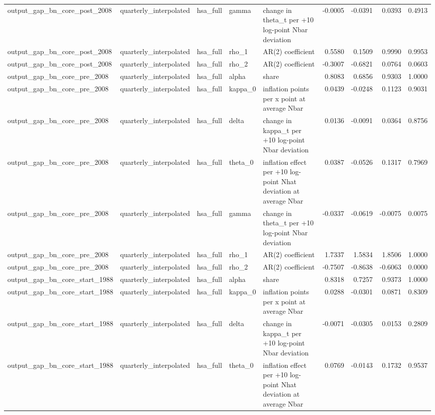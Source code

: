 \begin{tabular}{lllllrrrr}
output\_gap\_bn\_core\_post\_2008 & quarterly\_interpolated & hsa\_full & gamma & change in theta\_t per +10 log-point Nbar deviation & -0.0005 & -0.0391 & 0.0393 & 0.4913 \\
output\_gap\_bn\_core\_post\_2008 & quarterly\_interpolated & hsa\_full & rho\_1 & AR(2) coefficient & 0.5580 & 0.1509 & 0.9990 & 0.9953 \\
output\_gap\_bn\_core\_post\_2008 & quarterly\_interpolated & hsa\_full & rho\_2 & AR(2) coefficient & -0.3007 & -0.6821 & 0.0764 & 0.0603 \\
output\_gap\_bn\_core\_pre\_2008 & quarterly\_interpolated & hsa\_full & alpha & share & 0.8083 & 0.6856 & 0.9303 & 1.0000 \\
output\_gap\_bn\_core\_pre\_2008 & quarterly\_interpolated & hsa\_full & kappa\_0 & inflation points per x point at average Nbar & 0.0439 & -0.0248 & 0.1123 & 0.9031 \\
output\_gap\_bn\_core\_pre\_2008 & quarterly\_interpolated & hsa\_full & delta & change in kappa\_t per +10 log-point Nbar deviation & 0.0136 & -0.0091 & 0.0364 & 0.8756 \\
output\_gap\_bn\_core\_pre\_2008 & quarterly\_interpolated & hsa\_full & theta\_0 & inflation effect per +10 log-point Nhat deviation at average Nbar & 0.0387 & -0.0526 & 0.1317 & 0.7969 \\
output\_gap\_bn\_core\_pre\_2008 & quarterly\_interpolated & hsa\_full & gamma & change in theta\_t per +10 log-point Nbar deviation & -0.0337 & -0.0619 & -0.0075 & 0.0075 \\
output\_gap\_bn\_core\_pre\_2008 & quarterly\_interpolated & hsa\_full & rho\_1 & AR(2) coefficient & 1.7337 & 1.5834 & 1.8506 & 1.0000 \\
output\_gap\_bn\_core\_pre\_2008 & quarterly\_interpolated & hsa\_full & rho\_2 & AR(2) coefficient & -0.7507 & -0.8638 & -0.6063 & 0.0000 \\
output\_gap\_bn\_core\_start\_1988 & quarterly\_interpolated & hsa\_full & alpha & share & 0.8318 & 0.7257 & 0.9373 & 1.0000 \\
output\_gap\_bn\_core\_start\_1988 & quarterly\_interpolated & hsa\_full & kappa\_0 & inflation points per x point at average Nbar & 0.0288 & -0.0301 & 0.0871 & 0.8309 \\
output\_gap\_bn\_core\_start\_1988 & quarterly\_interpolated & hsa\_full & delta & change in kappa\_t per +10 log-point Nbar deviation & -0.0071 & -0.0305 & 0.0153 & 0.2809 \\
output\_gap\_bn\_core\_start\_1988 & quarterly\_interpolated & hsa\_full & theta\_0 & inflation effect per +10 log-point Nhat deviation at average Nbar & 0.0769 & -0.0143 & 0.1732 & 0.9537 \\

\end{tabular}
